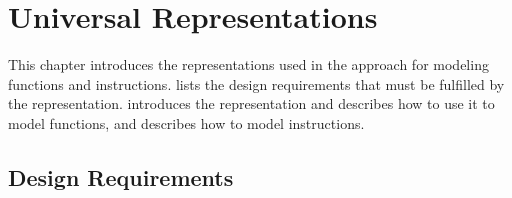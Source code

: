 %

\chapter{Universal Representations}

This chapter introduces the representations used in the approach for modeling
\glspl{function} and \glspl{instruction}.
%
 lists the design requirements that must
be fulfilled by the representation.
%
 introduces the representation and describes how
to use it to model \glspl{function}, and 
describes how to model \glspl{instruction}.



\section{Design Requirements}

